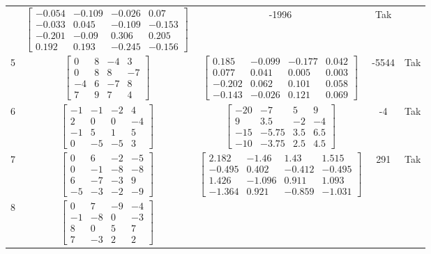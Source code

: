 \documentclass[a4paper,12pt]{article}
\begin{document}
\begin{tabular}{c c c c c}
&
$\begin{bmatrix} -0.054 & -0.109 & -0.026 & 0.07 \\ -0.033 & 0.045 & -0.109 & -0.153 \\ -0.201 & -0.09 & 0.306 & 0.205 \\ 0.192 & 0.193 & -0.245 & -0.156 \end{bmatrix}$
&
-1996
&
Tak
\\
5
&
$\begin{bmatrix} 0 & 8 & -4 & 3 \\ 0 & 8 & 8 & -7 \\ -4 & 6 & -7 & 8 \\ 7 & 9 & 7 & 4 \end{bmatrix}$
&
$\begin{bmatrix} 0.185 & -0.099 & -0.177 & 0.042 \\ 0.077 & 0.041 & 0.005 & 0.003 \\ -0.202 & 0.062 & 0.101 & 0.058 \\ -0.143 & -0.026 & 0.121 & 0.069 \end{bmatrix}$
&
-5544
&
Tak
\\
6
&
$\begin{bmatrix} -1 & -1 & -2 & 4 \\ 2 & 0 & 0 & -4 \\ -1 & 5 & 1 & 5 \\ 0 & -5 & -5 & 3 \end{bmatrix}$
&
$\begin{bmatrix} -20 & -7 & 5 & 9 \\ 9 & 3.5 & -2 & -4 \\ -15 & -5.75 & 3.5 & 6.5 \\ -10 & -3.75 & 2.5 & 4.5 \end{bmatrix}$
&
-4
&
Tak
\\
7
&
$\begin{bmatrix} 0 & 6 & -2 & -5 \\ 0 & -1 & -8 & -8 \\ 6 & -7 & -3 & 9 \\ -5 & -3 & -2 & -9 \end{bmatrix}$
&
$\begin{bmatrix} 2.182 & -1.46 & 1.43 & 1.515 \\ -0.495 & 0.402 & -0.412 & -0.495 \\ 1.426 & -1.096 & 0.911 & 1.093 \\ -1.364 & 0.921 & -0.859 & -1.031 \end{bmatrix}$
&
291
&
Tak
\\
8
&
$\begin{bmatrix} 0 & 7 & -9 & -4 \\ -1 & -8 & 0 & -3 \\ 8 & 0 & 5 & 7 \\ 7 & -3 & 2 & 2 \end{bmatrix}$

\end{tabular}
\end{document}
